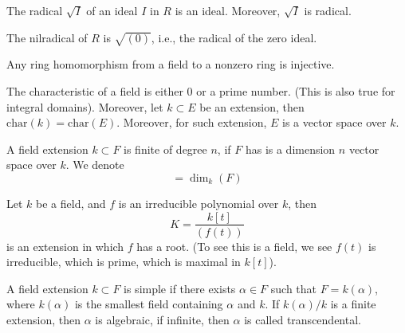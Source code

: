 \documentclass[openany]{book}
\begin{document}
\begin{prop}
    The radical $\sqrt{I}$ of an ideal $I$ in $R$ is an ideal. Moreover, $\sqrt{I}$ is radical.
\end{prop}

\begin{example}
    The nilradical of $R$ is $\sqrt{(0)}$, i.e., the radical of the zero ideal.
\end{example}








\begin{prop}
    Any ring homomorphism from a field to a nonzero ring is injective.
\end{prop}


\begin{prop}
    The characteristic of a field is either $0$ or a prime number. (This is also true for integral domains). Moreover, let $k\subset E$ be an extension, then $\text{char}(k)=\text{char}(E)$. Moreover, for such extension, $E$ is a vector space over $k$. 
\end{prop}







\begin{defn}
    A field extension $k\subset F$ is finite of degree $n$, if $F$ has is a dimension $n$ vector space over $k$. We denote 
    \begin{equation*}
        [F:k]=\dim_k(F)
    \end{equation*}
\end{defn}

\begin{example}
    Let $k$ be a field, and $f$ is an irreducible polynomial over $k$, then 
    \begin{equation*}
        K=\frac{k[t]}{(f(t))}
    \end{equation*}
    is an extension in which $f$ has a root. (To see this is a field, we see $f(t)$ is irreducible, which is prime, which is maximal in $k[t]$).
\end{example}


\begin{defn}
    A field extension $k\subset F$ is simple if there exists $\alpha\in F$ such that $F=k(\alpha)$, where $k(\alpha)$ is the smallest field containing $\alpha$ and $k$. If $k(\alpha)/k$ is a finite extension, then $\alpha$ is algebraic, if infinite, then $\alpha$ is called transcendental.
\end{defn}
\end{document}
